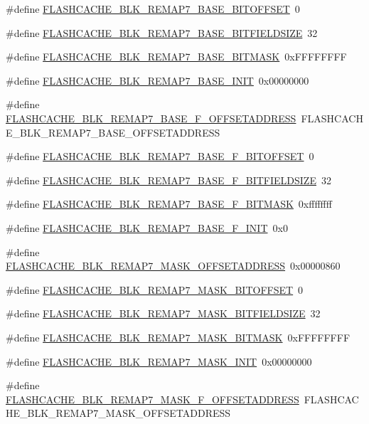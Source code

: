 \begin{DoxyCompactItemize}
\#define \hyperlink{a00550_a099d287924e6161297ef1875c1e7622e}{FLASHCACHE\_\-BLK\_\-REMAP7\_\-BASE\_\-BITOFFSET}~0
\item 
\#define \hyperlink{a00550_a3335af8f9604329dc37691b7fc2269e5}{FLASHCACHE\_\-BLK\_\-REMAP7\_\-BASE\_\-BITFIELDSIZE}~32
\item 
\#define \hyperlink{a00550_ac166d8dc84c3559b16d02eee390b3ba6}{FLASHCACHE\_\-BLK\_\-REMAP7\_\-BASE\_\-BITMASK}~0xFFFFFFFF
\item 
\#define \hyperlink{a00550_a26d48a68459b28b81fdd1e8e6151e2d2}{FLASHCACHE\_\-BLK\_\-REMAP7\_\-BASE\_\-INIT}~0x00000000
\item 
\#define \hyperlink{a00550_a3c2314bb3d6364e02142c8d717220eae}{FLASHCACHE\_\-BLK\_\-REMAP7\_\-BASE\_\-F\_\-OFFSETADDRESS}~FLASHCACHE\_\-BLK\_\-REMAP7\_\-BASE\_\-OFFSETADDRESS
\item 
\#define \hyperlink{a00550_afa14ae22e09571c32e5fbd167f423c91}{FLASHCACHE\_\-BLK\_\-REMAP7\_\-BASE\_\-F\_\-BITOFFSET}~0
\item 
\#define \hyperlink{a00550_a2cae9416a4e5322ad67fa64f734afcb0}{FLASHCACHE\_\-BLK\_\-REMAP7\_\-BASE\_\-F\_\-BITFIELDSIZE}~32
\item 
\#define \hyperlink{a00550_a98f376fcbba0650b7d62f5c9e8e2bf6d}{FLASHCACHE\_\-BLK\_\-REMAP7\_\-BASE\_\-F\_\-BITMASK}~0xffffffff
\item 
\#define \hyperlink{a00550_aae9524af11f60ae4ba5f7e5d9a4e7897}{FLASHCACHE\_\-BLK\_\-REMAP7\_\-BASE\_\-F\_\-INIT}~0x0
\item 
\#define \hyperlink{a00550_a2fd09c94ce5bb40c67970708ce0e3f22}{FLASHCACHE\_\-BLK\_\-REMAP7\_\-MASK\_\-OFFSETADDRESS}~0x00000860
\item 
\#define \hyperlink{a00550_ad170570ad1618110d55bb0546b43376f}{FLASHCACHE\_\-BLK\_\-REMAP7\_\-MASK\_\-BITOFFSET}~0
\item 
\#define \hyperlink{a00550_af105a7bf7f5736960c4a0c81d66af66d}{FLASHCACHE\_\-BLK\_\-REMAP7\_\-MASK\_\-BITFIELDSIZE}~32
\item 
\#define \hyperlink{a00550_ae80b8ba3a763eaf3740c610c8ea203ec}{FLASHCACHE\_\-BLK\_\-REMAP7\_\-MASK\_\-BITMASK}~0xFFFFFFFF
\item 
\#define \hyperlink{a00550_a8b2ab3b793d8ad5d16a25c2b78f0ebcd}{FLASHCACHE\_\-BLK\_\-REMAP7\_\-MASK\_\-INIT}~0x00000000
\item 
\#define \hyperlink{a00550_a32e0af946fb21139f635ef63093e2240}{FLASHCACHE\_\-BLK\_\-REMAP7\_\-MASK\_\-F\_\-OFFSETADDRESS}~FLASHCACHE\_\-BLK\_\-REMAP7\_\-MASK\_\-OFFSETADDRESS
\item 

\end{DoxyCompactItemize}
